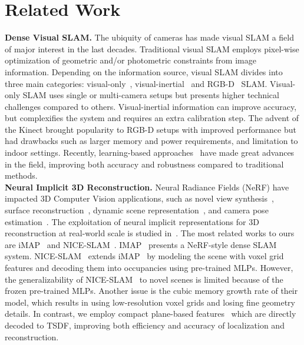 \section{Related Work}

\noindent \textbf{Dense Visual SLAM.} The ubiquity of cameras has made visual SLAM a field of major interest in the last decades. Traditional visual SLAM employs pixel-wise optimization of geometric and/or photometric constraints from image information. Depending on the information source, visual SLAM divides into three main categories: visual-only~\citep{newcombe2011dtam, engel2014lsd, forster2014svo, mur2017orb, Tateno_2017_CVPR, engel2017direct}, visual-inertial~\citep{mourikis2007multi, leutenegger2015keyframe, bloesch2015robust, mur2017visual, qin2018vins, von2018direct} and RGB-D~\citep{newcombe2011kinectfusion, kerl2013dense, endres20133, campos2021orb} SLAM. Visual-only SLAM uses single or multi-camera setups but presents higher technical challenges compared to others. Visual-inertial information can improve accuracy, but complexifies the system and requires an extra calibration step. The advent of the Kinect brought popularity to RGB-D setups with improved performance but had drawbacks such as larger memory and power requirements, and limitation to indoor settings. Recently, learning-based approaches~\citep{bloesch2018codeslam, li2018undeepvo, li2020deepslam, czarnowski2020deepfactors, teed2021droid} have made great advances in the field, improving both accuracy and robustness compared to traditional methods. \\

\noindent\textbf{Neural Implicit 3D Reconstruction.}  Neural Radiance Fields (NeRF) have impacted 3D Computer Vision applications, such as novel view synthesis~\citep{mildenhall2020nerf, martin2021nerf, verbin2022ref, mildenhall2022nerf}, surface reconstruction~\citep{park2019deepsdf, yariv2021volume, oechsle2021unisurf, wang2021neus, zhang2021ners, wang2022neuris, yariv2020multiview}, dynamic scene representation~\citep{gao2021dynamic, park2021nerfies, pumarola2021d, park2021hypernerf}, and camera pose estimation~\citep{yen2021inerf, wang2021nerf, lin2021barf, jeong2021self, xia2022sinerf}. The exploitation of neural implicit representations for 3D reconstruction at real-world scale is studied in~\cite{azinovic2022neural, wang2022go, bozic2021transformerfusion, choe2021volumefusion, murez2020atlas, sun2021neuralrecon, weder2021neuralfusion, yan2021continual, li2022bnv}. The most related works to ours are iMAP~\citep{sucar2021imap} and NICE-SLAM~\citep{zhu2022nice}. IMAP~\citep{sucar2021imap} presents a NeRF-style dense SLAM system. NICE-SLAM~\citep{zhu2022nice} extends iMAP~\citep{sucar2021imap} by modeling the scene with voxel grid features and decoding them into occupancies using pre-trained MLPs. However, the generalizability of NICE-SLAM~\citep{zhu2022nice} to novel scenes is limited because of the frozen pre-trained MLPs. Another issue is the cubic memory growth rate of their model, which results in using low-resolution voxel grids and losing fine geometry details. In contrast, we employ compact plane-based features~\citep{chan2022efficient} which are directly decoded to TSDF, improving both efficiency and accuracy of localization and reconstruction.


